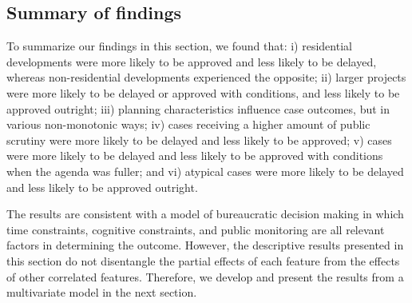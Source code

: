 \subsection{Summary of findings}

To summarize our findings in this section, we found that: i) residential developments were more likely to be approved and less likely to be delayed, whereas non-residential developments experienced the opposite; ii) larger projects were more likely to be delayed or approved with conditions, and less likely to be approved outright; iii) planning characteristics influence case outcomes, but in various non-monotonic ways; iv) cases receiving a higher amount of public scrutiny were more likely to be delayed and less likely to be approved; v) cases were more likely to be delayed and less likely to be approved with conditions when the agenda was fuller; and vi) atypical cases were more likely to be delayed and less likely to be approved outright.

The results are consistent with a model of bureaucratic decision making in which time constraints, cognitive constraints, and public monitoring are all relevant factors in determining the outcome. However, the descriptive results presented in this section do not disentangle the partial effects of each feature from the effects of other correlated features. Therefore, we develop and present the results from a multivariate model in the next section.





